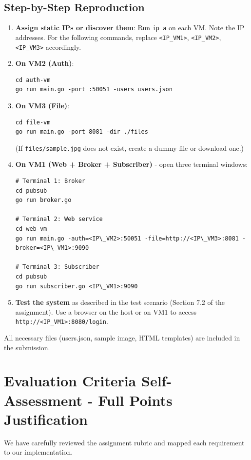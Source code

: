 \documentclass[a4paper]{article}
\begin{document}
\subsection{Step-by-Step Reproduction}
\begin{enumerate}
    \item \textbf{Assign static IPs or discover them}: Run \texttt{ip a} on each VM. Note the IP addresses. For the following commands, replace \texttt{<IP\_VM1>}, \texttt{<IP\_VM2>}, \texttt{<IP\_VM3>} accordingly.
    \item \textbf{On VM2 (Auth)}:
        \begin{verbatim}
cd auth-vm
go run main.go -port :50051 -users users.json
        \end{verbatim}
    \item \textbf{On VM3 (File)}:
        \begin{verbatim}
cd file-vm
go run main.go -port 8081 -dir ./files
        \end{verbatim}
        (If \texttt{files/sample.jpg} does not exist, create a dummy file or download one.)
    \item \textbf{On VM1 (Web + Broker + Subscriber)} - open three terminal windows:
        \begin{verbatim}
# Terminal 1: Broker
cd pubsub
go run broker.go

# Terminal 2: Web service
cd web-vm
go run main.go -auth=<IP\_VM2>:50051 -file=http://<IP\_VM3>:8081 -broker=<IP\_VM1>:9090

# Terminal 3: Subscriber
cd pubsub
go run subscriber.go <IP\_VM1>:9090
        \end{verbatim}
    \item \textbf{Test the system} as described in the test scenario (Section 7.2 of the assignment). Use a browser on the host or on VM1 to access \texttt{http://<IP\_VM1>:8080/login}.
\end{enumerate}
All necessary files (users.json, sample image, HTML templates) are included in the submission.

\section{Evaluation Criteria Self-Assessment - Full Points Justification}
We have carefully reviewed the assignment rubric and mapped each requirement to our implementation.
\end{document}
